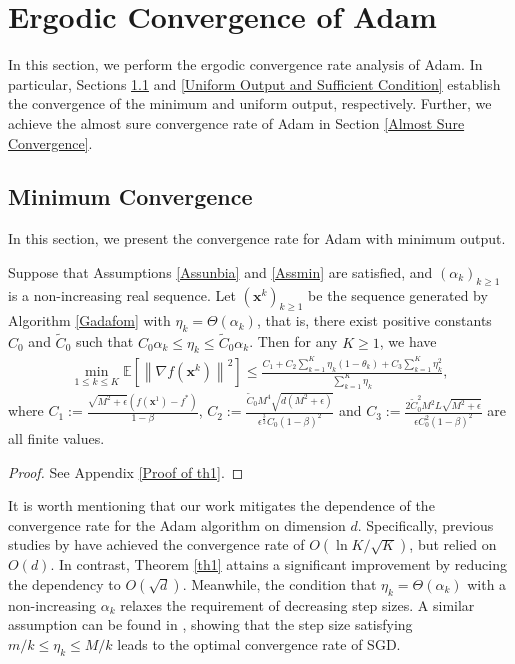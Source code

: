 \documentclass[twoside,11pt]{article}
\begin{document}
\section{Ergodic Convergence of Adam}\label{ERGODIC}
In this section, we perform the ergodic  convergence rate analysis of Adam. In particular, Sections \ref{Minimum Output} and \ref{Uniform Output and Sufficient Condition} establish the convergence of the minimum and uniform output, respectively. Further, we achieve the almost sure convergence rate of Adam in Section \ref{Almost Sure Convergence}.

\subsection{Minimum Convergence}\label{Minimum Output}
In this section, we present the convergence rate for Adam with minimum output.
\begin{theorem}\label{th1}
Suppose that Assumptions \ref{Assunbia} and \ref{Assmin} are satisfied, and $(\alpha_k)_{k\ge 1}$ is a non-increasing real sequence. Let $(\mathbf{x}^k)_{k\ge 1}$ be the sequence generated by Algorithm \ref{Gadafom} with $\eta_k=\Theta(\alpha_{k})$, that is, there exist  positive constants $C_0$ and $\tilde{C}_0$ such that $C_0\alpha_k\le \eta_{k}\le \tilde{C}_0 \alpha_k$. Then for any $K\ge 1$, we have
\begin{equation}\label{th1.1}
	\begin{aligned}
	\min_{1\le k\le K}\mathbb{E}\left[\left\| \nabla f(\mathbf{x}^k)\right\|^2\right]
	\le
	\frac{C_1
		+C_2\sum_{k=1}^{K}\eta_k(1-\theta_k)+C_3 \sum_{k=1}^{K}\eta_{k}^2}{\sum_{k=1}^{K}\eta_{k}},\nonumber
	\end{aligned}
\end{equation}
where $C_1:=\frac{\sqrt{M^2+\epsilon}\left( f(\mathbf{x}^1)-f^*\right) }{1-\beta}$, $C_2:=\frac{\tilde{C}_0 M^4\sqrt{d(M^2+\epsilon)}}{\epsilon^{\frac{3}{2}}C_0(1-\beta)^2}$ and  $C_3:=\frac{2\tilde{C}_0^2 M^2L\sqrt{M^2+\epsilon}}{\epsilon C_0^2(1-\beta)^2}$ are all finite values.
\end{theorem}
\begin{proof}
	See Appendix \ref{Proof of th1}.
\end{proof}

\par It is worth mentioning  that our work mitigates the dependence of the convergence rate for the Adam algorithm on dimension $d$. Specifically, previous studies by \citet{zou2019sufficient,defossezsimple,zhang2022adam} have achieved the convergence rate of $O(\ln K/\sqrt{K})$, but relied on $O(d)$. In contrast, Theorem \ref{th1} attains a significant improvement by reducing the dependency to $O(\sqrt{d})$. Meanwhile, the condition that $\eta_{k}=\Theta(\alpha_{k})$ with a non-increasing $\alpha_{k}$ relaxes the requirement of decreasing step sizes. A similar assumption can be found in \cite{wang}, showing that the step size satisfying $m/k\leq \eta_{k}\leq M/k$ leads to the optimal convergence rate of SGD.
\end{document}
